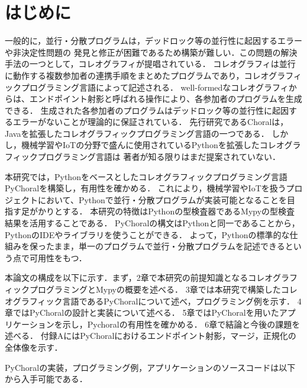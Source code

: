 \documentclass{thesis}
\begin{document}

\maketitle %
\frontmatter\tableofcontents\mainmatter %

\chapter{はじめに}

一般的に，並行・分散プログラムは，デッドロック等の並行性に起因するエラーや非決定性問題の
発見と修正が困難であるため構築が難しい．この問題の解決手法の一つとして，\textsf{コレオグラフィ}が提唱されている．
コレオグラフィは並行に動作する複数参加者の連携手順をまとめたプログラムであり，コレオグラフィックプログラミング言語によって記述される．
well-formedなコレオグラフィからは、\textsf{エンドポイント射影}と呼ばれる操作により、各参加者のプログラムを生成できる．
生成された各参加者のプログラムはデッドロック等の並行性に起因するエラーがないことが理論的に保証されている．
先行研究であるChoralは，Javaを拡張したコレオグラフィックプログラミング言語の一つである．
しかし，機械学習やIoTの分野で盛んに使用されているPythonを拡張したコレオグラフィックプログラミング言語は
著者が知る限りはまだ提案されていない．

本研究では，Pythonをベースとしたコレオグラフィックプログラミング言語\textsf{PyChoral}を構築し，有用性を確かめる．
これにより，機械学習やIoTを扱うプロジェクトにおいて、Pythonで並行・分散プログラムが実装可能となることを目指す足がかりとする．
本研究の特徴はPythonの型検査器である\textsf{Mypy}の型検査結果を活用することである．
PyChoralの構文はPythonと同一であることから，PythonのIDEやライブラリを使うことができる．
よって，Pythonの標準的な仕組みを保ったまま，単一のプログラムで並行・分散プログラムを記述できるという点で可用性をもつ．

本論文の構成を以下に示す．まず，2章で本研究の前提知識となるコレオグラフィックプログラミングとMypyの概要を述べる．
3章では本研究で構築したコレオグラフィック言語であるPyChoralについて述べ，プログラミング例を示す．
4章ではPyChoralの設計と実装について述べる．
5章ではPyChoralを用いたアプリケーションを示し，Pychoralの有用性を確かめる．
6章で結論と今後の課題を述べる．
付録AにはPyChoralにおけるエンドポイント射影，マージ，正規化の全体像を示す．

PyChoralの実装，プログラミング例，アプリケーションのソースコードは以下から入手可能である．
\end{document}
